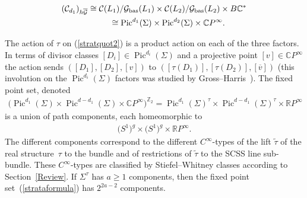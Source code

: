 \documentclass[10pt,a4paper]{amsart}
\numberwithin{equation}{section}
\begin{document}
\begin{gather*} ({\mathcal C}_{d_1})_{h\overline{{\mathcal G}}} \cong {\mathcal C}(L_1)/ {\mathcal G}_{\rm bas}(L_1) \times {\mathcal C}(L_2)/ {\mathcal G}_{\rm bas}(L_2) \times B {\mathbb C}^*\\
\hphantom{({\mathcal C}_{d_1})_{h\overline{{\mathcal G}}} }{} \cong \operatorname{Pic}^{d_1}(\Sigma) \times \operatorname{Pic}^{d_2}(\Sigma) \times {\mathbb C} P^{\infty}.
\end{gather*}

The action of $\tau$ on (\ref{stratquot2}) is a product action on each of the three factors. In terms of divisor classes $[D_i] \in \operatorname{Pic}^{d_i}(\Sigma)$ and a projective point $[v] \in {\mathbb C} P^{\infty}$ the action sends $ ([D_1], [D_2], [v])$ to $([\tau(D_1)], [\tau(D_2)], [\overline{v}])$ (this involution on the $\operatorname{Pic}^{d_i}(\Sigma)$ factors was studied by Gross--Harris~\cite{GH2}). The f\/ixed point set, denoted
\begin{gather}\label{strataformula}
\big(\operatorname{Pic}^{d_1}(\Sigma) \times \operatorname{Pic}^{d - d_1}(\Sigma) \times {\mathbb C} P^{\infty}\big)^{{\mathbb Z}_2} = \operatorname{Pic}^{d_1}(\Sigma)^{\tau} \times \operatorname{Pic}^{d - d_1}(\Sigma)^{\tau} \times {\mathbb R} P^{\infty}
\end{gather}
is a union of path components, each homeomorphic to
\begin{gather*} \big(S^1\big)^g \times \big(S^1\big)^g \times {\mathbb R} P^{\infty}.\end{gather*}
The dif\/ferent components correspond to the dif\/ferent $C^{\infty}$-types of the lift $\tilde{\tau}$ of the real struc\-tu\-re~$\tau$ to the bundle and of restrictions of $\tilde{\tau}$ to the SCSS line sub-bundle. These $C^{\infty}$-types are classif\/ied by Stiefel--Whitney classes according to Section~\ref{Review}. If $\Sigma^{\tau}$ has $a \geq 1$ components, then the f\/ixed point set~(\ref{strataformula}) has $2^{2a-2}$ components.
\end{document}
